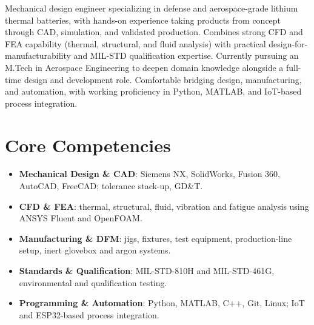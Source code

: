 \documentclass[11pt,a4paper,sans]{moderncv}
\begin{document}
\makecvtitle


\vspace{6pt}
\small{Mechanical design engineer specializing in defense and aerospace-grade lithium thermal batteries, with hands-on experience taking products from concept through CAD, simulation, and validated production. Combines strong CFD and FEA capability (thermal, structural, and fluid analysis) with practical design-for-manufacturability and MIL-STD qualification expertise. Currently pursuing an M.Tech in Aerospace Engineering to deepen domain knowledge alongside a full-time design and development role. Comfortable bridging design, manufacturing, and automation, with working proficiency in Python, MATLAB, and IoT-based process integration.}


\section{Core Competencies}
\vspace{1pt}
\begin{itemize}

\item \textbf{Mechanical Design \& CAD}: Siemens NX, SolidWorks, Fusion 360, AutoCAD, FreeCAD; tolerance stack-up, GD\&T.

\item \textbf{CFD \& FEA}: thermal, structural, fluid, vibration and fatigue analysis using ANSYS Fluent and OpenFOAM.

\item \textbf{Manufacturing \& DFM}: jigs, fixtures, test equipment, production-line setup, inert glovebox and argon systems.

\item \textbf{Standards \& Qualification}: MIL-STD-810H and MIL-STD-461G, environmental and qualification testing.

\item \textbf{Programming \& Automation}: Python, MATLAB, C++, Git, Linux; IoT and ESP32-based process integration.

\end{itemize}
\end{document}
